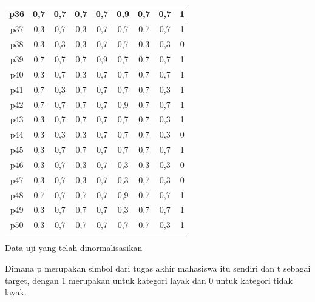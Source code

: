 \begin{center}
	\begin{tabular}{|c|c|c|c|c|c|c|c|c|}
		\hline
		p36 & 0,7 & 0,7 & 0,7 & 0,7 & 0,9 & 0,7 & 0,7 & 1 \\
		\hline
		p37 & 0,3 & 0,7 & 0,3 & 0,7 & 0,7 & 0,7 & 0,7 & 1 \\
		\hline
		p38 & 0,3 & 0,3 & 0,3 & 0,7 & 0,7 & 0,3 & 0,3 & 0 \\
		\hline
		p39 & 0,7 & 0,7 & 0,7 & 0,9 & 0,7 & 0,7 & 0,7 & 1 \\
		\hline
		p40 & 0,3 & 0,7 & 0,3 & 0,7 & 0,7 & 0,7 & 0,7 & 1 \\
		\hline
		p41 & 0,7 & 0,3 & 0,7 & 0,7 & 0,7 & 0,7 & 0,3 & 1 \\
		\hline
		p42 & 0,7 & 0,7 & 0,7 & 0,7 & 0,9 & 0,7 & 0,7 & 1 \\
		\hline
		p43 & 0,3 & 0,7 & 0,7 & 0,7 & 0,7 & 0,7 & 0,3 & 1 \\
		\hline
		p44 & 0,3 & 0,3 & 0,3 & 0,7 & 0,7 & 0,7 & 0,3 & 0 \\
		\hline
		p45 & 0,3 & 0,7 & 0,7 & 0,7 & 0,7 & 0,7 & 0,7 & 1 \\
		\hline
		p46 & 0,3 & 0,7 & 0,3 & 0,7 & 0,3 & 0,3 & 0,3 & 0 \\
		\hline
		p47 & 0,3 & 0,7 & 0,3 & 0,7 & 0,3 & 0,7 & 0,3 & 0 \\
		\hline
		p48 & 0,7 & 0,7 & 0,7 & 0,7 & 0,9 & 0,7 & 0,7 & 1 \\
		\hline
		p49 & 0,3 & 0,7 & 0,7 & 0,7 & 0,3 & 0,7 & 0,7 & 1 \\
		\hline
		p50 & 0,3 & 0,7 & 0,7 & 0,7 & 0,7 & 0,7 & 0,3 & 1 \\
		\hline
	\end{tabular}
	\par
	\bigskip
	Data uji yang telah dinormalisasikan
\end{center}


Dimana p merupakan simbol dari tugas akhir mahasiswa itu sendiri dan t sebagai target, dengan 1 merupakan untuk kategori layak dan 0 untuk kategori tidak layak.

